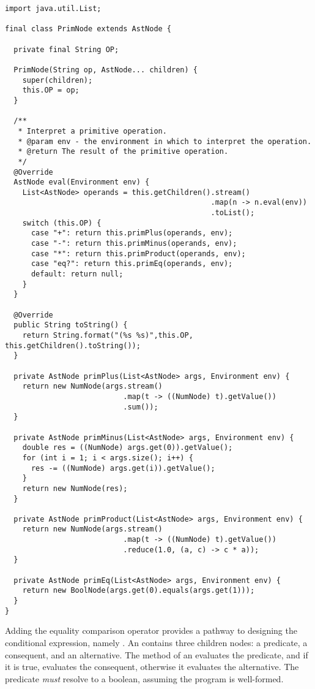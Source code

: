 \begin{lstlisting}[language=MyJava]
import java.util.List;

final class PrimNode extends AstNode {

  private final String OP;

  PrimNode(String op, AstNode... children) {
    super(children);
    this.OP = op;
  }

  /**
   * Interpret a primitive operation.
   * @param env - the environment in which to interpret the operation.
   * @return The result of the primitive operation.
   */
  @Override
  AstNode eval(Environment env) {
    List<AstNode> operands = this.getChildren().stream()
                                               .map(n -> n.eval(env))
                                               .toList();
    switch (this.OP) {
      case "+": return this.primPlus(operands, env);
      case "-": return this.primMinus(operands, env);
      case "*": return this.primProduct(operands, env);
      case "eq?": return this.primEq(operands, env);
      default: return null;
    }
  }

  @Override
  public String toString() {
    return String.format("(%s %s)",this.OP, this.getChildren().toString());
  }

  private AstNode primPlus(List<AstNode> args, Environment env) {
    return new NumNode(args.stream()
                           .map(t -> ((NumNode) t).getValue())
                           .sum());
  }

  private AstNode primMinus(List<AstNode> args, Environment env) {
    double res = ((NumNode) args.get(0)).getValue();
    for (int i = 1; i < args.size(); i++) {
      res -= ((NumNode) args.get(i)).getValue();
    }
    return new NumNode(res);
  }

  private AstNode primProduct(List<AstNode> args, Environment env) {
    return new NumNode(args.stream()
                           .map(t -> ((NumNode) t).getValue())
                           .reduce(1.0, (a, c) -> c * a));
  }

  private AstNode primEq(List<AstNode> args, Environment env) {
    return new BoolNode(args.get(0).equals(args.get(1)));
  }
}
\end{lstlisting}

Adding the equality comparison operator provides a pathway to designing the conditional expression, namely . 
An  contains three children nodes: a predicate, a consequent, and an alternative. 
The  method of an  evaluates the predicate, and if it is true, evaluates the consequent, otherwise it evaluates the alternative. 
The predicate \emph{must} resolve to a boolean, assuming the program is well-formed. 

